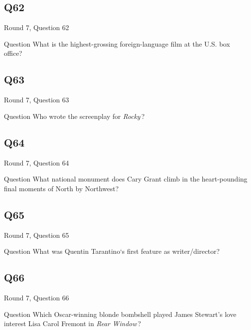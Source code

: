 \documentclass[11pt]{beamer}
\begin{document}
\subsection*{Q62}
\begin{frame}[t]{Round 7, Question 62}
\vspace{2em}
\begin{block}{Question}
What is the highest-grossing foreign-language film at the U.S. box office?
\end{block}
\end{frame}
    

\subsection*{Q63}
\begin{frame}[t]{Round 7, Question 63}
\vspace{2em}
\begin{block}{Question}
Who wrote the screenplay for \emph{Rocky}\,?
\end{block}
\end{frame}
    

\subsection*{Q64}
\begin{frame}[t]{Round 7, Question 64}
\vspace{2em}
\begin{block}{Question}
What national monument does Cary Grant climb in the heart-pounding final moments of North by Northwest?
\end{block}
\end{frame}
    

\subsection*{Q65}
\begin{frame}[t]{Round 7, Question 65}
\vspace{2em}
\begin{block}{Question}
What was Quentin Tarantino`s first feature as writer/director?
\end{block}
\end{frame}
    

\subsection*{Q66}
\begin{frame}[t]{Round 7, Question 66}
\vspace{2em}
\begin{block}{Question}
Which Oscar-winning blonde bombshell played James Stewart's love interest Lisa Carol Fremont in \emph{Rear Window}\,?
\end{block}
\end{frame}
    
\end{document}
